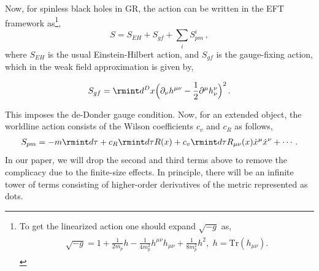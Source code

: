 Now, for spinless black holes in GR, the action can be written in the EFT framework as\footnote{To get the linearized action one should expand $\sqrt{-g}$ as,
\begin{align}
    \begin{split}
        \sqrt{-g}=1+\frac{1}{2m_p} h-\frac{1}{4m_p^2} h^{\mu\nu}h_{\mu\nu}+\frac{1}{8m_p^2}h^2,\,\, h=\text{Tr}( h_{\mu\nu}).\nonumber
    \end{split}
\end{align}},
$$S=S_{EH}+S_{gf}+\sum_i S_{pm}^i\,,$$
where $S_{EH}$ is the usual Einstein-Hilbert action, and $S_{gf}$ is the gauge-fixing action, which in the weak field approximation is given by,

$$S_{gf}=\rmint d^D x\Big(\partial_\nu h^{\mu\nu}-\frac{1}{2}\partial^\mu h^{\nu}_{\nu}\Big)^2\,.$$

This imposes the de-Donder gauge condition. Now, for an extended object, the worldline action consists of the Wilson coefficients $c_v$ and $c_R$ as follows,
\begin{align}S_{pm}=-m\rmint d\tau +c_R\rmint d\tau R(x)+c_v\rmint d\tau R_{\mu\nu}(x)\dot{x}^\mu \dot{x}^\nu+\cdots\,.\end{align}
In our paper, we will drop the second and third terms above to remove the complicacy due to the finite-size effects. In principle, there will be an infinite tower of terms consisting of higher-order derivatives of the metric represented as dots. 




